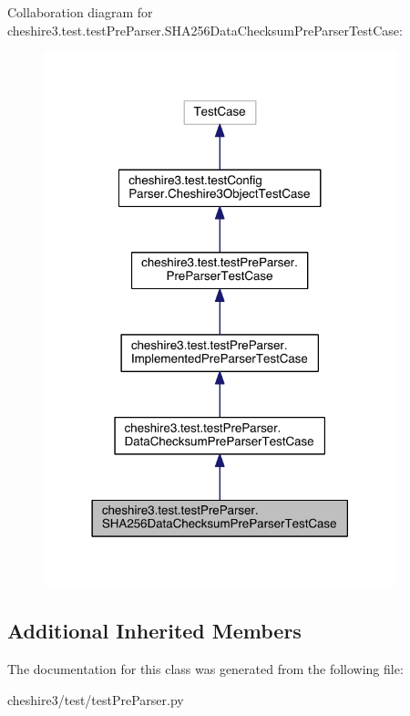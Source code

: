 Collaboration diagram for cheshire3.\-test.\-test\-Pre\-Parser.\-S\-H\-A256\-Data\-Checksum\-Pre\-Parser\-Test\-Case\-:
\nopagebreak
\begin{figure}[H]
\begin{center}
\leavevmode
\includegraphics[width=290pt]{classcheshire3_1_1test_1_1test_pre_parser_1_1_s_h_a256_data_checksum_pre_parser_test_case__coll__graph}
\end{center}
\end{figure}
\subsection*{Additional Inherited Members}


The documentation for this class was generated from the following file\-:\begin{DoxyCompactItemize}
\item 
cheshire3/test/test\-Pre\-Parser.\-py\end{DoxyCompactItemize}
